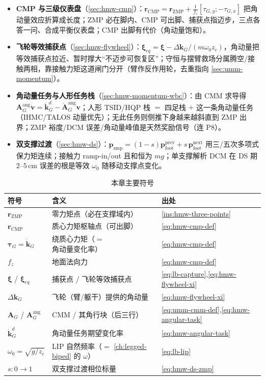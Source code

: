 \begin{itemize}
  \item \textbf{CMP 与三级仪表盘}（\cref{sec:hmw-cmp}）：$\mathbf r_{\mathrm{CMP}}=\mathbf r_{\mathrm{ZMP}}+\frac{1}{f_z}[\tau_{G,y};-\tau_{G,x}]$ 把角动量效应折算成长度；ZMP 必在脚内、CMP 可出脚、捕获点指迈步，三点各答一问、合成平衡仪表盘；CMP 出脚有代价（角动量饱和）。
  \item \textbf{飞轮等效捕获点}（\cref{sec:hmw-flywheel}）：$\boldsymbol\xi_{eq}=\boldsymbol\xi-\Delta\mathbf k_G/(m\omega_0 z_c)$，角动量把等效捕获点拉近、暂时撑大“不迈步可恢复区”；守恒与摆臂救场分属腾空/接触两相，靠接触力矩这道闸门分开（臂作反作用轮，去重指向 \cref{sec:umm-momentum}）。
  \item \textbf{角动量任务与人形任务栈}（\cref{sec:hmw-momentum-wbc}）：由 CMM 求导得 $\mathbf A_G^{\mathrm{ang}}\dot{\mathbf v}=\dot{\mathbf k}_G^d-\dot{\mathbf A}_G^{\mathrm{ang}}\mathbf v$；人形 TSID/HQP 栈 $=$ 四足栈 $+$ 这一条角动量任务（IHMC/TALOS 动量优先）；无此任务则侧推下身越来越斜直到 ZMP 出界；ZMP 裕度/DCM 误差/角动量峰值是天然奖励信号（连 P8）。
  \item \textbf{双支撑过渡}（\cref{sec:hmw-ds}）：$\mathbf p_{\mathrm{zmp}}=(1-s)\mathbf p_{\mathrm{foot}}^{\mathrm{prev}}+s\,\mathbf p_{\mathrm{foot}}^{\mathrm{next}}$ 用三/五次多项式保力矩连续；接触力 ramp-in/out 且和恒为 $mg$；单支撑解析 DCM 在 DS 期 $2$–$5\,\mathrm{cm}$ 误差的根是等效 $\omega_0$ 随移动支撑点变化。
\end{itemize}

\begin{table}[H]\centering\small
\caption{本章主要符号}
\begin{tabular}{lll}
\toprule
符号 & 含义 & 出处 \\
\midrule
$\mathbf r_{\mathrm{ZMP}}$ & 零力矩点（必在支撑域内） & \cref{ins:hmw-three-points} \\
$\mathbf r_{\mathrm{CMP}}$ & 质心力矩枢轴点（可出脚） & \cref{eq:hmw-cmp-def} \\
$\boldsymbol\tau_G=\dot{\mathbf k}_G$ & 绕质心力矩（$=$ 角动量变化率） & \cref{eq:hmw-cmp-def} \\
$f_z$ & 地面法向力 & \cref{eq:hmw-cmp-def} \\
$\boldsymbol\xi$ / $\boldsymbol\xi_{eq}$ & 捕获点 / 飞轮等效捕获点 & \cref{eq:lb-capture},\cref{eq:hmw-flywheel-xi} \\
$\Delta\mathbf k_G$ & 飞轮（臂/躯干）提供的角动量 & \cref{eq:hmw-flywheel-xi} \\
$\mathbf A_G$ / $\mathbf A_G^{\mathrm{ang}}$ & CMM / 其角行块（后三行） & \cref{eq:umm-cmm-def},\cref{eq:hmw-angular-task} \\
$\dot{\mathbf k}_G^d$ & 角动量任务期望变化率 & \cref{eq:hmw-angular-task} \\
$\omega_0=\sqrt{g/z_c}$ & LIP 自然频率（$=$ \cref{ch:legged-biped} 的 $\omega$） & \cref{eq:lb-lip} \\
$s:0\to1$ & 双支撑过渡相位标量 & \cref{eq:hmw-ds-zmp} \\
\bottomrule
\end{tabular}
\end{table}

